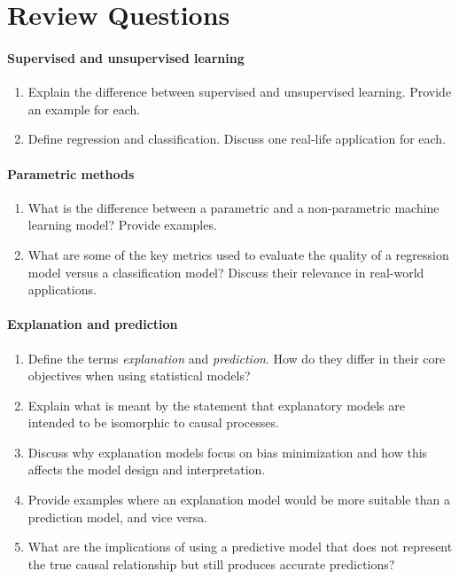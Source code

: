 \section{Review Questions}
\paragraph*{Supervised and unsupervised learning}
\begin{enumerate}[nosep]
    \item Explain the difference between supervised and unsupervised learning. Provide an example for each.
    \item Define regression and classification. Discuss one real-life application for each.
\end{enumerate}
\paragraph*{Parametric methods}
\begin{enumerate}
    \item What is the difference between a parametric and a non-parametric machine learning model? Provide examples.
    \item What are some of the key metrics used to evaluate the quality of a regression model versus a classification model? Discuss their relevance in real-world applications.
\end{enumerate}
\paragraph*{Explanation and prediction}
\begin{enumerate}
    \item Define the terms \emph{explanation} and \emph{prediction}. How do they differ in their core objectives when using statistical models?
    \item Explain what is meant by the statement that explanatory models are intended to be isomorphic to causal processes.
    \item Discuss why explanation models focus on bias minimization and how this affects the model design and interpretation.
    \item Provide examples where an explanation model would be more suitable than a prediction model, and vice versa.
    \item What are the implications of using a predictive model that does not represent the true causal relationship but still produces accurate predictions?
\end{enumerate}
